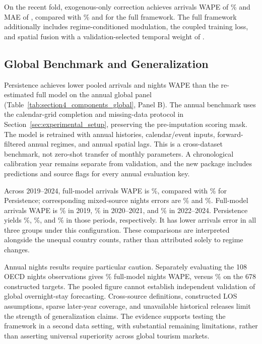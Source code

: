 \documentclass[sigconf]{acmart}
\begin{document}
On the recent fold, exogenous-only correction achieves arrivals WAPE of \ResultExoArrWAPE\% and MAE of \ResultExoArrMAE, compared with \ResultFullArrWAPE\% and \ResultFullArrMAE{} for the full framework. The full framework additionally includes regime-conditioned modulation, the coupled training loss, and spatial fusion with a validation-selected temporal weight of \ResultWeightRecent.

\subsection{Global Benchmark and Generalization}
\label{sec:global_generalization}
Persistence achieves lower pooled arrivals and nights WAPE than the re-estimated full model on the annual global panel (Table~\ref{tab:section4_components_global}, Panel B). The annual benchmark uses the calendar-grid completion and missing-data protocol in Section~\ref{sec:experimental_setup}, preserving the pre-imputation scoring mask. The model is retrained with annual histories, calendar/event inputs, forward-filtered annual regimes, and annual spatial lags. This is a cross-dataset benchmark, not zero-shot transfer of monthly parameters. A chronological calibration year remains separate from validation, and the new package includes predictions and source flags for every annual evaluation key.

Across 2019--2024, full-model arrivals WAPE is \ResultAnnualFullAllArr\%, compared with \ResultAnnualNaiveAllArr\% for Persistence; corresponding mixed-source nights errors are \ResultAnnualFullAllNig\% and \ResultAnnualNaiveAllNig\%. Full-model arrivals WAPE is \ResultAnnualFullPreArr\% in 2019, \ResultAnnualFullShockArr\% in 2020--2021, and \ResultAnnualFullRecoveryArr\% in 2022--2024. Persistence yields \ResultAnnualNaivePreArr\%, \ResultAnnualNaiveShockArr\%, and \ResultAnnualNaiveRecoveryArr\% in those periods, respectively. It has lower arrivals error in all three groups under this configuration. These comparisons are interpreted alongside the unequal country counts, rather than attributed solely to regime changes.

Annual nights results require particular caution. Separately evaluating the 108 OECD nights observations gives \ResultAnnualObservedNig\% full-model nights WAPE, versus \ResultAnnualConstructedNig\% on the 678 constructed targets. The pooled figure cannot establish independent validation of global overnight-stay forecasting. Cross-source definitions, constructed LOS assumptions, sparse later-year coverage, and unavailable historical releases limit the strength of generalization claims. The evidence supports testing the framework in a second data setting, with substantial remaining limitations, rather than asserting universal superiority across global tourism markets.
\end{document}
